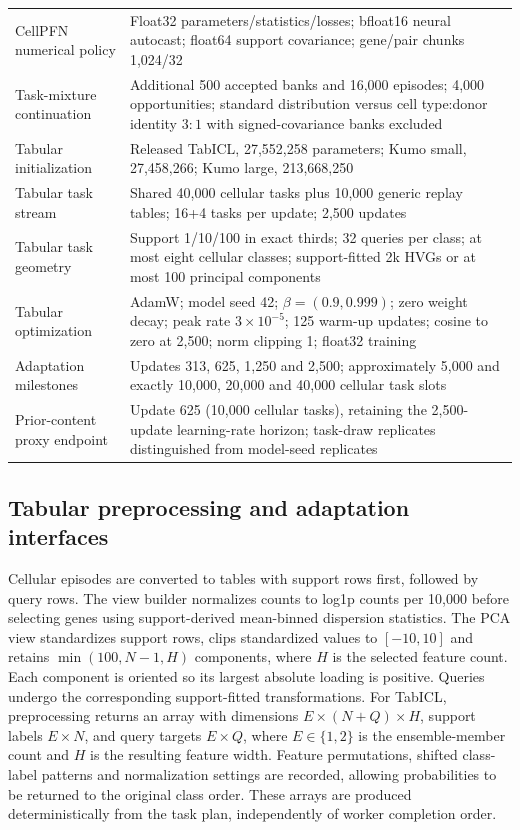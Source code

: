 \begin{longtable}{p{}p{}}
CellPFN numerical policy & Float32 parameters/statistics/losses; bfloat16 neural autocast; float64 support covariance; gene/pair chunks 1,024/32\\
Task-mixture continuation & Additional 500 accepted banks and 16,000 episodes; 4,000 opportunities; standard distribution versus cell type:donor identity $3:1$ with signed-covariance banks excluded\\
Tabular initialization & Released TabICL, 27,552,258 parameters; Kumo small, 27,458,266; Kumo large, 213,668,250\\
Tabular task stream & Shared 40,000 cellular tasks plus 10,000 generic replay tables; 16+4 tasks per update; 2,500 updates\\
Tabular task geometry & Support 1/10/100 in exact thirds; 32 queries per class; at most eight cellular classes; support-fitted 2k HVGs or at most 100 principal components\\
Tabular optimization & AdamW; model seed 42; $\beta=(0.9,0.999)$; zero weight decay; peak rate $3\times10^{-5}$; 125 warm-up updates; cosine to zero at 2,500; norm clipping 1; float32 training\\
Adaptation milestones & Updates 313, 625, 1,250 and 2,500; approximately 5,000 and exactly 10,000, 20,000 and 40,000 cellular task slots\\
Prior-content proxy endpoint & Update 625 (10,000 cellular tasks), retaining the 2,500-update learning-rate horizon; task-draw replicates distinguished from model-seed replicates\\
\bottomrule
\end{longtable}
\endgroup

\subsection*{Tabular preprocessing and adaptation interfaces}
\label{supp:adaptation-interfaces}
Cellular episodes are converted to tables with support rows first, followed by query rows. The view builder normalizes counts to log1p counts per 10,000 before selecting genes using support-derived mean-binned dispersion statistics. The PCA view standardizes support rows, clips standardized values to $[-10,10]$ and retains $\min(100,N-1,H)$ components, where $H$ is the selected feature count. Each component is oriented so its largest absolute loading is positive. Queries undergo the corresponding support-fitted transformations. For TabICL, preprocessing returns an array with dimensions $E\times(N+Q)\times H$, support labels $E\times N$, and query targets $E\times Q$, where $E\in\{1,2\}$ is the ensemble-member count and $H$ is the resulting feature width. Feature permutations, shifted class-label patterns and normalization settings are recorded, allowing probabilities to be returned to the original class order. These arrays are produced deterministically from the task plan, independently of worker completion order.

